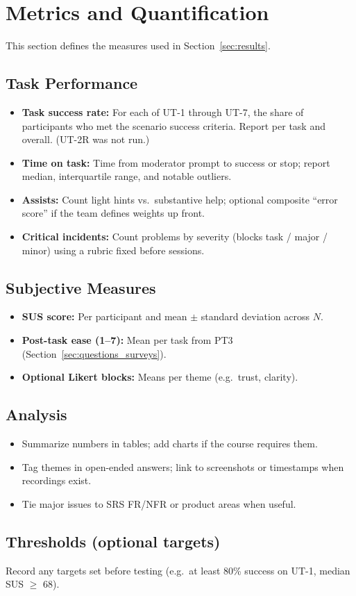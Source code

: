 \section{Metrics and Quantification}
\label{sec:metrics}

This section defines the measures used in Section~\ref{sec:results}.

\subsection{Task Performance}

\begin{itemize}
  \item \textbf{Task success rate:} For each of UT-1 through UT-7, the share of participants who met the scenario success criteria. Report per task and overall. (UT-2R was not run.)
  \item \textbf{Time on task:} Time from moderator prompt to success or stop; report median, interquartile range, and notable outliers.
  \item \textbf{Assists:} Count light hints vs.\ substantive help; optional composite ``error score'' if the team defines weights up front.
  \item \textbf{Critical incidents:} Count problems by severity (blocks task / major / minor) using a rubric fixed before sessions.
\end{itemize}

\subsection{Subjective Measures}

\begin{itemize}
  \item \textbf{SUS score:} Per participant and mean $\pm$ standard deviation across $N$.
  \item \textbf{Post-task ease (1--7):} Mean per task from PT3 (Section~\ref{sec:questions_surveys}).
  \item \textbf{Optional Likert blocks:} Means per theme (e.g.\ trust, clarity).
\end{itemize}

\subsection{Analysis}

\begin{itemize}
  \item Summarize numbers in tables; add charts if the course requires them.
  \item Tag themes in open-ended answers; link to screenshots or timestamps when recordings exist.
  \item Tie major issues to SRS FR/NFR or product areas when useful.
\end{itemize}

\subsection{Thresholds (optional targets)}

Record any targets set before testing (e.g.\ at least 80\% success on UT-1, median SUS $\geq$ 68).
